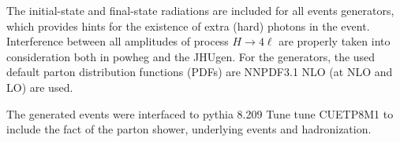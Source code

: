 \par 
The initial-state and final-state radiations are included for all events generators, which provides hints for the existence of extra (hard) photons in the event. 
Interference between all amplitudes of process $H \rightarrow 4\ell$ are properly taken into consideration both in {\sc powheg} and the {\sc JHUgen}.
For the generators, the used default parton distribution functions (PDFs) are NNPDF3.1 NLO (at NLO and LO) are used.
\par
The generated events were interfaced to {\sc pythia 8.209} Tune tune CUETP8M1 to include the fact of the parton shower, underlying events and hadronization.
 \par
